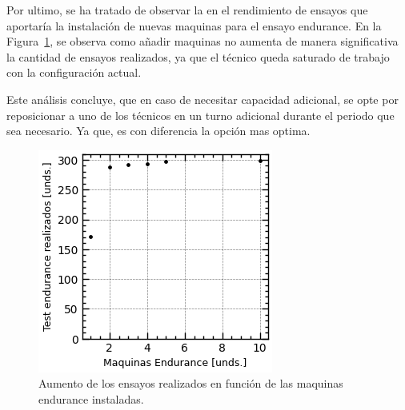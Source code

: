 Por ultimo, se ha tratado de observar la en el rendimiento de ensayos
que aportaría la instalación de nuevas maquinas para el ensayo endurance.
En la Figura~\ref{fig:4_sctr_indoor}, se observa como añadir maquinas
no aumenta de manera significativa la cantidad de ensayos realizados,
ya que el técnico queda saturado de trabajo con la configuración actual.

Este análisis concluye, que en caso de necesitar capacidad adicional,
se opte por reposicionar a uno de los técnicos
en un turno adicional durante el periodo que sea necesario.
Ya que, es con diferencia la opción mas optima.

\begin{figure}[H]
	\begin{center}
	\includegraphics{fig/4_sctr_indoor}
	\end{center}
	\caption{Aumento de los ensayos realizados en función de las maquinas endurance instaladas.}
	\label{fig:4_sctr_indoor}
\end{figure}
